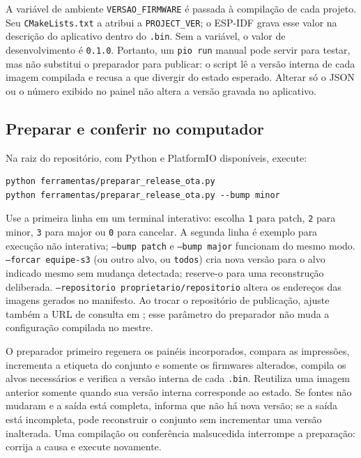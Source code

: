 A variável de ambiente \texttt{VERSAO\_FIRMWARE} é passada à compilação de cada projeto. Seu \texttt{CMakeLists.txt} a atribui a \texttt{PROJECT\_VER}; o ESP-IDF grava esse valor na descrição do aplicativo dentro do \texttt{.bin}. Sem a variável, o valor de desenvolvimento é \texttt{0.1.0}. Portanto, um \texttt{pio run} manual pode servir para testar, mas não substitui o preparador para publicar: o script lê a versão interna de cada imagem compilada e recusa a que divergir do estado esperado. Alterar só o JSON ou o número exibido no painel não altera a versão gravada no aplicativo.

\subsection{Preparar e conferir no computador}
Na raiz do repositório, com Python e PlatformIO disponíveis, execute:
\begin{lstlisting}[caption={Escolha interativa ou explícita do incremento}]
python ferramentas/preparar_release_ota.py
python ferramentas/preparar_release_ota.py --bump minor
\end{lstlisting}
Use a primeira linha em um terminal interativo: escolha \texttt{1} para patch, \texttt{2} para minor, \texttt{3} para major ou \texttt{0} para cancelar. A segunda linha é exemplo para execução não interativa; \texttt{--bump patch} e \texttt{--bump major} funcionam do mesmo modo. \texttt{--forcar equipe-s3} (ou outro alvo, ou \texttt{todos}) cria nova versão para o alvo indicado mesmo sem mudança detectada; reserve-o para uma reconstrução deliberada. \texttt{--repositorio proprietario/repositorio} altera os endereços das imagens gerados no manifesto. Ao trocar o repositório de publicação, ajuste também a URL de consulta em ; esse parâmetro do preparador não muda a configuração compilada no mestre.

O preparador primeiro regenera os painéis incorporados, compara as impressões, incrementa a etiqueta do conjunto e somente os firmwares alterados, compila os alvos necessários e verifica a versão interna de cada \texttt{.bin}. Reutiliza uma imagem anterior somente quando sua versão interna corresponde ao estado. Se fontes não mudaram e a saída está completa, informa que não há nova versão; se a saída está incompleta, pode reconstruir o conjunto sem incrementar uma versão inalterada. Uma compilação ou conferência malsucedida interrompe a preparação: corrija a causa e execute novamente.

